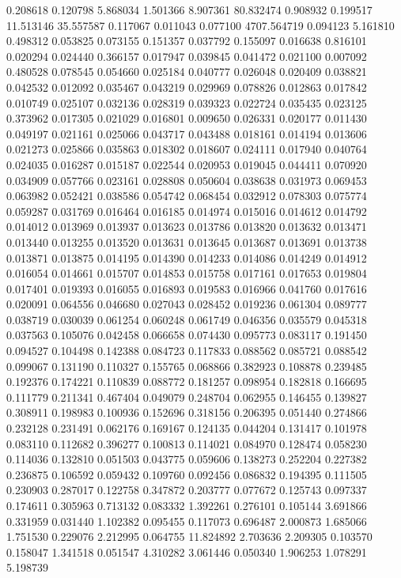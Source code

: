 0.208618
0.120798
5.868034
1.501366
8.907361
80.832474
0.908932
0.199517
11.513146
35.557587
0.117067
0.011043
0.077100
4707.564719
0.094123
5.161810
0.498312
0.053825
0.073155
0.151357
0.037792
0.155097
0.016638
0.816101
0.020294
0.024440
0.366157
0.017947
0.039845
0.041472
0.021100
0.007092
0.480528
0.078545
0.054660
0.025184
0.040777
0.026048
0.020409
0.038821
0.042532
0.012092
0.035467
0.043219
0.029969
0.078826
0.012863
0.017842
0.010749
0.025107
0.032136
0.028319
0.039323
0.022724
0.035435
0.023125
0.373962
0.017305
0.021029
0.016801
0.009650
0.026331
0.020177
0.011430
0.049197
0.021161
0.025066
0.043717
0.043488
0.018161
0.014194
0.013606
0.021273
0.025866
0.035863
0.018302
0.018607
0.024111
0.017940
0.040764
0.024035
0.016287
0.015187
0.022544
0.020953
0.019045
0.044411
0.070920
0.034909
0.057766
0.023161
0.028808
0.050604
0.038638
0.031973
0.069453
0.063982
0.052421
0.038586
0.054742
0.068454
0.032912
0.078303
0.075774
0.059287
0.031769
0.016464
0.016185
0.014974
0.015016
0.014612
0.014792
0.014012
0.013969
0.013937
0.013623
0.013786
0.013820
0.013632
0.013471
0.013440
0.013255
0.013520
0.013631
0.013645
0.013687
0.013691
0.013738
0.013871
0.013875
0.014195
0.014390
0.014233
0.014086
0.014249
0.014912
0.016054
0.014661
0.015707
0.014853
0.015758
0.017161
0.017653
0.019804
0.017401
0.019393
0.016055
0.016893
0.019583
0.016966
0.041760
0.017616
0.020091
0.064556
0.046680
0.027043
0.028452
0.019236
0.061304
0.089777
0.038719
0.030039
0.061254
0.060248
0.061749
0.046356
0.035579
0.045318
0.037563
0.105076
0.042458
0.066658
0.074430
0.095773
0.083117
0.191450
0.094527
0.104498
0.142388
0.084723
0.117833
0.088562
0.085721
0.088542
0.099067
0.131190
0.110327
0.155765
0.068866
0.382923
0.108878
0.239485
0.192376
0.174221
0.110839
0.088772
0.181257
0.098954
0.182818
0.166695
0.111779
0.211341
0.467404
0.049079
0.248704
0.062955
0.146455
0.139827
0.308911
0.198983
0.100936
0.152696
0.318156
0.206395
0.051440
0.274866
0.232128
0.231491
0.062176
0.169167
0.124135
0.044204
0.131417
0.101978
0.083110
0.112682
0.396277
0.100813
0.114021
0.084970
0.128474
0.058230
0.114036
0.132810
0.051503
0.043775
0.059606
0.138273
0.252204
0.227382
0.236875
0.106592
0.059432
0.109760
0.092456
0.086832
0.194395
0.111505
0.230903
0.287017
0.122758
0.347872
0.203777
0.077672
0.125743
0.097337
0.174611
0.305963
0.713132
0.083332
1.392261
0.276101
0.105144
3.691866
0.331959
0.031440
1.102382
0.095455
0.117073
0.696487
2.000873
1.685066
1.751530
0.229076
2.212995
0.064755
11.824892
2.703636
2.209305
0.103570
0.158047
1.341518
0.051547
4.310282
3.061446
0.050340
1.906253
1.078291
5.198739

